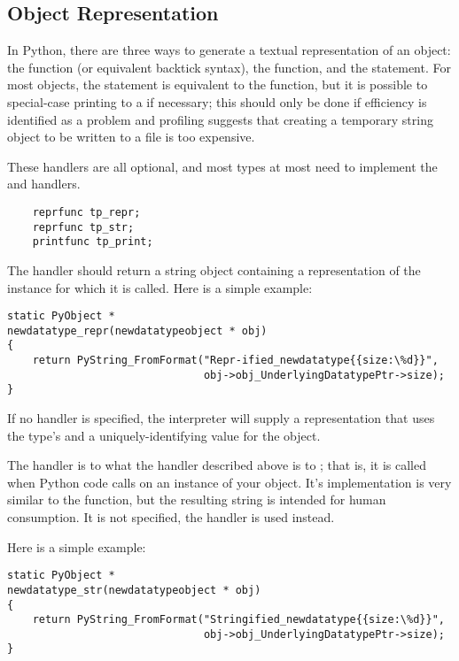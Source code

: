 \subsection{Object Representation}

In Python, there are three ways to generate a textual representation
of an object: the  function (or
equivalent backtick syntax), the 
function, and the  statement.  For most objects, the
 statement is equivalent to the 
function, but it is possible to special-case printing to a
 if necessary; this should only be done if efficiency is
identified as a problem and profiling suggests that creating a
temporary string object to be written to a file is too expensive.

These handlers are all optional, and most types at most need to
implement the  and  handlers.

\begin{verbatim}
    reprfunc tp_repr;
    reprfunc tp_str;
    printfunc tp_print;
\end{verbatim}

The  handler should return a string object containing
a representation of the instance for which it is called.  Here is a
simple example:

\begin{verbatim}
static PyObject *
newdatatype_repr(newdatatypeobject * obj)
{
    return PyString_FromFormat("Repr-ified_newdatatype{{size:\%d}}",
                               obj->obj_UnderlyingDatatypePtr->size);
}
\end{verbatim}

If no  handler is specified, the interpreter will
supply a representation that uses the type's  and a
uniquely-identifying value for the object.

The  handler is to  what the
 handler described above is to ; that
is, it is called when Python code calls  on an
instance of your object.  It's implementation is very similar to the
 function, but the resulting string is intended for
human consumption.  It  is not specified, the
 handler is used instead.

Here is a simple example:

\begin{verbatim}
static PyObject *
newdatatype_str(newdatatypeobject * obj)
{
    return PyString_FromFormat("Stringified_newdatatype{{size:\%d}}",
                               obj->obj_UnderlyingDatatypePtr->size);
}
\end{verbatim}

